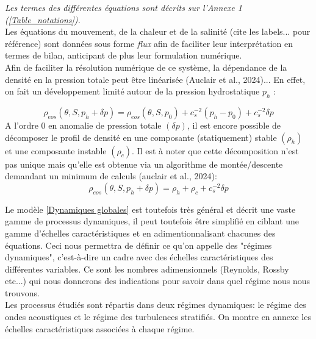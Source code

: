 \documentclass{rapportECC}
\begin{document}
\textit{Les termes des différentes équations  sont décrits sur l'Annexe 1 (\ref{Table_notations}).}
\\
Les équations du mouvement, de la chaleur et de la salinité (cite les labels... pour référence) sont données sous forme \textit{flux} afin de faciliter leur interprétation en termes de bilan, anticipant de plus leur formulation numérique. \\

\vspace{0.5 cm}
Afin de faciliter la résolution numérique de ce système, la dépendance de la densité en la pression totale peut être linéarisée (Auclair et al., 2024)... En effet, on fait un développement limité autour de la pression hydrostatique $p_h$ :

\begin{equation}
    \rho_{eos}(\theta, S, p_h +\delta p) = \rho_{eos}(\theta, S, p_0) + c_s^{-2}(p_h - p_0) + c_s^{-2}\delta p
\end{equation}
A l'ordre 0 en anomalie de pression totale $(\delta p)$, il est encore possible de décomposer le profil de densité en une composante (statiquement) stable $(\rho_h)$ et une composante instable $(\rho_c)$. Il est à noter que cette décomposition n'est pas unique mais qu'elle est obtenue via un algorithme de montée/descente demandant un minimum de calculs (auclair et al., 2024):
\begin{equation}
     \rho_{eos}(\theta, S, p_h +\delta p) =  \rho_h + \rho_c + c_s^{-2}\delta p
     \label{eq:decomp densite}
\end{equation}

\vspace{0.5 cm}

Le modèle \ref{Dynamiques globales} est toutefois très général et décrit une vaste gamme de processus dynamiques, il peut toutefois être simplifié en ciblant une gamme d'échelles caractéristiques et en adimentionnalisant chacunes des équations. Ceci nous permettra de définir ce qu'on appelle des "régimes dynamiques", c'est-à-dire un cadre avec des échelles caractéristiques des différentes variables. Ce sont les nombres adimensionnels (Reynolds, Rossby etc...) qui nous donnerons des indications pour savoir dans quel régime nous nous trouvons.\\
Les processus étudiés sont répartis dans deux régimes dynamiques: le régime des ondes acoustiques et le régime des turbulences stratifiés. On montre en annexe les échelles caractéristiques associées à chaque régime.
\end{document}

